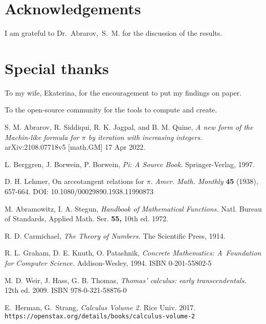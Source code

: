 \documentclass[draft, 10pt]{article} %
\begin{document}
\section{Acknowledgements}

I am grateful to Dr.~Abrarov,~S.~M. for the discussion of the results.

\section{Special thanks}

\noindent
To my wife, Ekaterina, for the encouragement to put my findings on paper.

\noindent
To the open-source community for the tools to compute and create. 

\begin{thebibliography}{999}

S. M. Abrarov, R. Siddiqui, R. K. Jagpal, and B. M. Quine,
{\it A new form of the Machin-like formula for $\pi$ by iteration with increasing integers.\/}
arXiv:2108.07718v5 [math.GM] 17 Apr 2022.

L. Berggren, J. Borwein, P. Borwein,
{\it Pi: A Source Book.\/}
Springer-Verlag, 1997.

D. H. Lehmer,
On arccotangent relations for $\pi$.
{\it Amer. Math. Monthly} {\bf 45}
(1938), 657-664. DOI: 10.1080/00029890.1938.11990873

M. Abramowitz, I. A. Stegun,
{\it Handbook of Mathematical Functions.\/}
Natl. Bureau of Standards, Applied Math. Ser. {\bf 55,} 10th ed. 1972.

R. D. Carmichael,
{\it The Theory of Numbers.\/}
The Scientific Press, 1914.

R. L. Graham, D. E. Knuth, O. Patashnik,
{\it Concrete Mathematics: A~Foundation for Computer Science.\/}
Addison-Wesley, 1994.\hfill\break
ISBN 0-201-55802-5

M. D. Weir, J. Hass, G. B. Thomas,
{\it Thomas’ calculus: early transcendentals.\/} 12th ed. 2009.
ISBN 978-0-321-58876-0

E.~Herman, %
G.~Strang, %
{\it Calculus Volume 2.\/} Rice Univ. 2017.\hfill\break
{\tt https://openstax.org/details/books/calculus-volume-2}


\end{thebibliography}
\end{document}
